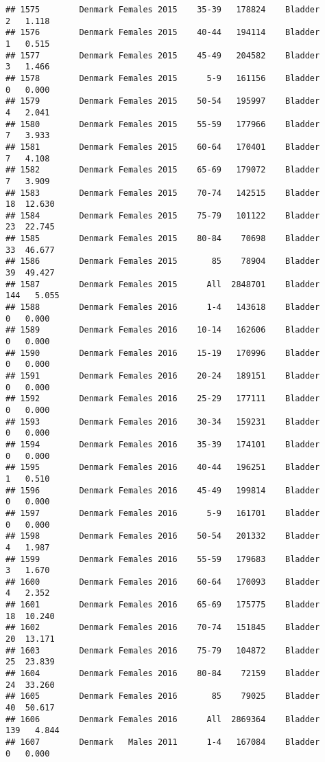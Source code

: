 \documentclass[
]{article}
\begin{document}
\begin{verbatim}
## 1575        Denmark Females 2015    35-39   178824    Bladder      2   1.118
## 1576        Denmark Females 2015    40-44   194114    Bladder      1   0.515
## 1577        Denmark Females 2015    45-49   204582    Bladder      3   1.466
## 1578        Denmark Females 2015      5-9   161156    Bladder      0   0.000
## 1579        Denmark Females 2015    50-54   195997    Bladder      4   2.041
## 1580        Denmark Females 2015    55-59   177966    Bladder      7   3.933
## 1581        Denmark Females 2015    60-64   170401    Bladder      7   4.108
## 1582        Denmark Females 2015    65-69   179072    Bladder      7   3.909
## 1583        Denmark Females 2015    70-74   142515    Bladder     18  12.630
## 1584        Denmark Females 2015    75-79   101122    Bladder     23  22.745
## 1585        Denmark Females 2015    80-84    70698    Bladder     33  46.677
## 1586        Denmark Females 2015       85    78904    Bladder     39  49.427
## 1587        Denmark Females 2015      All  2848701    Bladder    144   5.055
## 1588        Denmark Females 2016      1-4   143618    Bladder      0   0.000
## 1589        Denmark Females 2016    10-14   162606    Bladder      0   0.000
## 1590        Denmark Females 2016    15-19   170996    Bladder      0   0.000
## 1591        Denmark Females 2016    20-24   189151    Bladder      0   0.000
## 1592        Denmark Females 2016    25-29   177111    Bladder      0   0.000
## 1593        Denmark Females 2016    30-34   159231    Bladder      0   0.000
## 1594        Denmark Females 2016    35-39   174101    Bladder      0   0.000
## 1595        Denmark Females 2016    40-44   196251    Bladder      1   0.510
## 1596        Denmark Females 2016    45-49   199814    Bladder      0   0.000
## 1597        Denmark Females 2016      5-9   161701    Bladder      0   0.000
## 1598        Denmark Females 2016    50-54   201332    Bladder      4   1.987
## 1599        Denmark Females 2016    55-59   179683    Bladder      3   1.670
## 1600        Denmark Females 2016    60-64   170093    Bladder      4   2.352
## 1601        Denmark Females 2016    65-69   175775    Bladder     18  10.240
## 1602        Denmark Females 2016    70-74   151845    Bladder     20  13.171
## 1603        Denmark Females 2016    75-79   104872    Bladder     25  23.839
## 1604        Denmark Females 2016    80-84    72159    Bladder     24  33.260
## 1605        Denmark Females 2016       85    79025    Bladder     40  50.617
## 1606        Denmark Females 2016      All  2869364    Bladder    139   4.844
## 1607        Denmark   Males 2011      1-4   167084    Bladder      0   0.000

\end{verbatim}
\end{document}
